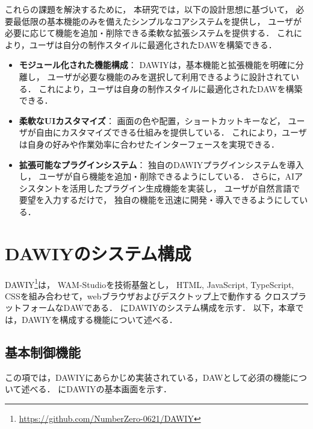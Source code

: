 これらの課題を解決するために，
本研究では，以下の設計思想に基づいて，
必要最低限の基本機能のみを備えたシンプルなコアシステムを提供し，
ユーザが必要に応じて機能を追加・削除できる柔軟な拡張システムを提供する．
これにより，ユーザは自分の制作スタイルに最適化されたDAWを構築できる．

\begin{itemize}
      \item \textbf{モジュール化された機能構成}：
            DAWIYは，基本機能と拡張機能を明確に分離し，
            ユーザが必要な機能のみを選択して利用できるように設計されている．
            これにより，ユーザは自身の制作スタイルに最適化されたDAWを構築できる．
      \item \textbf{柔軟なUIカスタマイズ}：
            画面の色や配置，ショートカットキーなど，
            ユーザが自由にカスタマイズできる仕組みを提供している．
            これにより，ユーザは自身の好みや作業効率に合わせたインターフェースを実現できる．
      \item \textbf{拡張可能なプラグインシステム}：
            独自のDAWIYプラグインシステムを導入し，
            ユーザが自ら機能を追加・削除できるようにしている．
            さらに，AIアシスタントを活用したプラグイン生成機能を実装し，
            ユーザが自然言語で要望を入力するだけで，
            独自の機能を迅速に開発・導入できるようにしている．
\end{itemize}


\section{DAWIYのシステム構成}
DAWIY\footnote{\url{https://github.com/NumberZero-0621/DAWIY}}は，
WAM-Studio\cite{WAM-studio-paper-2023}\footnotemark を技術基盤とし，
HTML, JavaScript, TypeScript, CSSを組み合わせて，webブラウザおよびデスクトップ上で動作する
クロスプラットフォームなDAWである．
%
にDAWIYのシステム構成を示す．
以下，本章では，DAWIYを構成する機能について述べる．



\subsection{基本制御機能}
この項では，DAWIYにあらかじめ実装されている，DAWとして必須の機能について述べる．
にDAWIYの基本画面を示す．


